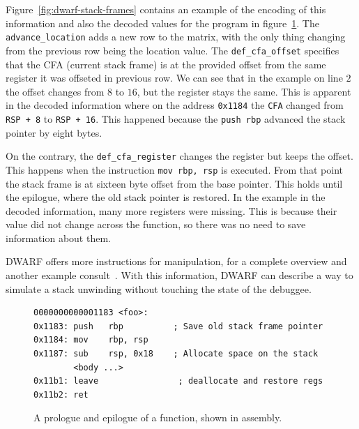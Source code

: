 Figure~\ref{fig:dwarf-stack-frames} contains an example of the encoding of this
information and also the decoded values for the program in
figure~\ref{fig:prologue-and-epilogue}. The \texttt{advance\_location} adds a
new row to the matrix, with the only thing changing from the previous row being
the location value. The \texttt{def\_cfa\_offset} specifies that the CFA
(current stack frame) is at the provided offset from the same register it was
offseted in previous row. We can see that in the example on line $2$ the offset
changes from $8$ to $16$, but the register stays the same. This is apparent in
the decoded information where on the address \texttt{0x1184} the \texttt{CFA}
changed from \texttt{RSP + 8} to \texttt{RSP + 16}. This happened because the
\texttt{push rbp} advanced the stack pointer by eight bytes.

On the contrary, the \verb|def_cfa_register| changes the register but keeps
the offset. This happens when the instruction \texttt{mov rbp, rsp} is
executed. From that point the stack frame is at sixteen byte offset from the
base pointer. This holds until the epilogue, where the old stack pointer is
restored. In the example in the decoded information, many more registers were
missing. This is because their value did not change across the function, so
there was no need to save information about them.

DWARF offers more instructions for manipulation, for a complete overview and
another example consult~\cite{dwarf}. With this information, DWARF can describe
a way to simulate a stack unwinding without touching the state of the debuggee.

\begin{figure}
    \begin{lstlisting}
0000000000001183 <foo>:
0x1183:	push   rbp          ; Save old stack frame pointer
0x1184:	mov    rbp, rsp     
0x1187:	sub    rsp, 0x18    ; Allocate space on the stack
        <body ...>
0x11b1:	leave                ; deallocate and restore regs
0x11b2:	ret
    \end{lstlisting}
    \caption{A prologue and epilogue of a function, shown in assembly.}
    \label{fig:prologue-and-epilogue}
\end{figure}

